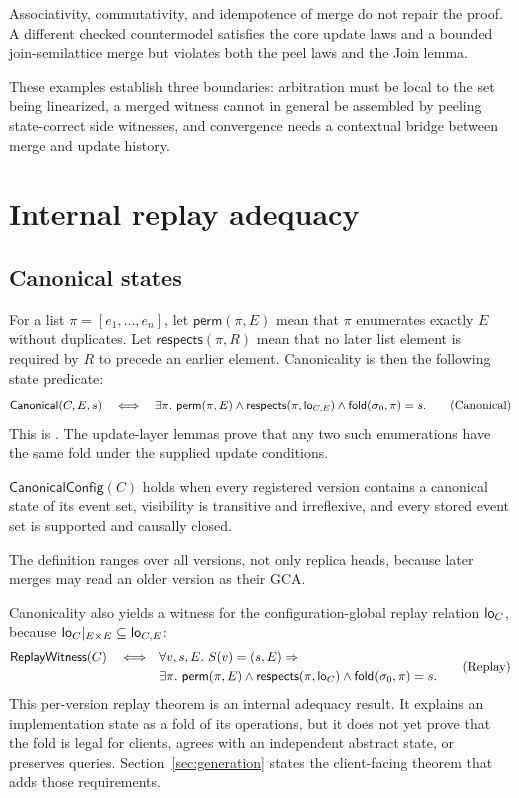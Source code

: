 Associativity, commutativity, and idempotence of merge do not repair the proof.
A different checked countermodel satisfies the core update laws and a bounded
join-semilattice merge but violates both the peel laws and the Join lemma.
\hfill{}

These examples establish three boundaries: arbitration must be local to the
set being linearized, a merged witness cannot in general be assembled by
peeling state-correct side witnesses, and convergence needs a contextual bridge
between merge and update history.

\section{Internal replay adequacy}
\label{sec:convergence}

\subsection{Canonical states}

For a list $\pi=[e_1,\ldots,e_n]$, let
$\mathsf{perm}(\pi,E)$ mean that $\pi$ enumerates exactly $E$ without
duplicates. Let $\mathsf{respects}(\pi,R)$ mean that no later list element is
required by $R$ to precede an earlier element. Canonicality is then the
following state predicate:
\[
 \mathsf{Canonical}(C,E,s)\quad\Longleftrightarrow\quad
 \exists\pi.\ \mathsf{perm}(\pi,E)\land
 \mathsf{respects}(\pi,\mathsf{lo}_{C,E})\land
 \mathsf{fold}(\sigma_0,\pi)=s.
 \tag*{(Canonical)}
\]
This is . The update-layer lemmas prove that any two
such enumerations have the same fold under the supplied update conditions.

\begin{definition}
$\mathsf{CanonicalConfig}(C)$ holds when every registered version contains a
canonical state of its event set, visibility is transitive and irreflexive,
and every stored event set is supported and causally closed.
\hfill{}
\end{definition}
The definition ranges over all versions, not only replica heads, because later
merges may read an older version as their GCA.

Canonicality also yields a witness for the configuration-global replay
relation $\mathsf{lo}_C$, because
$\mathsf{lo}_C|_{E\times E}\subseteq\mathsf{lo}_{C,E}$:
\[
 \begin{aligned}
 \mathsf{ReplayWitness}(C)\quad\Longleftrightarrow\quad
 &\forall v,s,E.\ S(v)=(s,E)\Rightarrow {}\\
 &\exists\pi.\ \mathsf{perm}(\pi,E)\land
 \mathsf{respects}(\pi,\mathsf{lo}_C)\land
 \mathsf{fold}(\sigma_0,\pi)=s.
 \end{aligned}
 \tag*{(Replay)}
\]
This per-version replay theorem is an internal adequacy result. It explains an
implementation state as a fold of its operations, but it does not yet prove
that the fold is legal for clients, agrees with an independent abstract state,
or preserves queries. Section~\ref{sec:generation} states the client-facing
theorem that adds those requirements.

